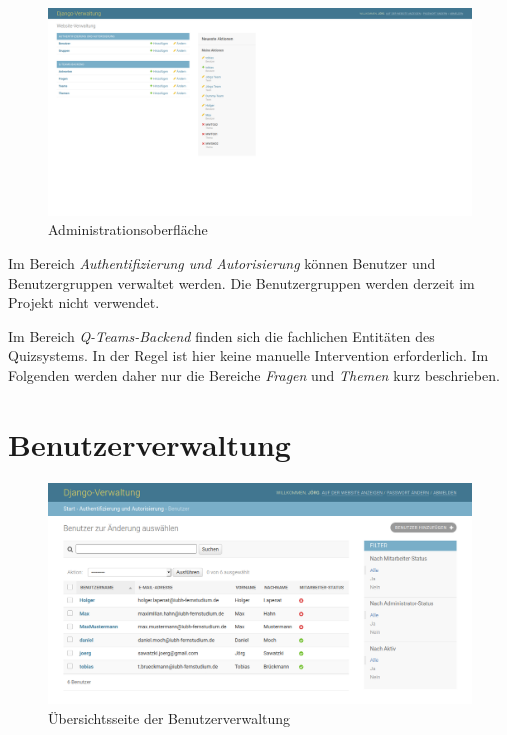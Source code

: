 \documentclass[a4paper,11pt,listof=numbered,glossary=totoc,parskip=half,toc=bib]{scrreprt}
\begin{document}
\begin{appendices}
	\begin{figure}[h!]
		\centering
		\includegraphics[width=\textwidth]{admin}
		\caption{Administrationsoberfläche}
		\label{fig:admin}
	\end{figure}
	
	Im Bereich \textit{Authentifizierung und Autorisierung} können Benutzer und Benutzergruppen verwaltet werden. Die Benutzergruppen werden derzeit im Projekt nicht verwendet.
	
	Im Bereich \textit{Q-Teams-Backend} finden sich die fachlichen Entitäten des Quizsystems. In der Regel ist hier keine manuelle Intervention erforderlich. Im Folgenden werden daher nur die Bereiche \textit{Fragen} und \textit{Themen} kurz beschrieben. 
	
	\section{Benutzerverwaltung}
	
	\begin{figure}
		\centering
		\includegraphics[width=\textwidth]{benutzer}
		\caption{Übersichtsseite der Benutzerverwaltung}
		\label{fig:benutzer}
	\end{figure}
	

\end{appendices}
\end{document}
